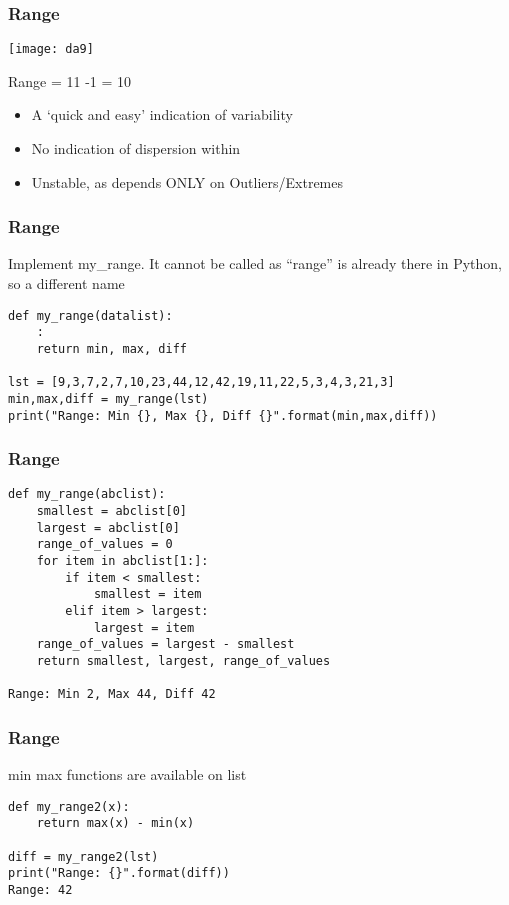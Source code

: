 \begin{frame}[fragile]\frametitle{Range}	
\begin{center}
\texttt{[image: da9]}
\end{center}
Range = 11 -1 = 10

\begin{itemize}
\item A `quick and easy' indication of variability
\item No indication of dispersion within
\item Unstable, as depends ONLY on Outliers/Extremes
\end{itemize}
\end{frame}

\begin{frame}[fragile]\frametitle{Range}
Implement my\_range. It cannot be called as ``range'' is already there in Python, so a different name
\begin{lstlisting}
def my_range(datalist):
	:
	return min, max, diff

lst = [9,3,7,2,7,10,23,44,12,42,19,11,22,5,3,4,3,21,3]
min,max,diff = my_range(lst)
print("Range: Min {}, Max {}, Diff {}".format(min,max,diff))
\end{lstlisting}
\end{frame}

\begin{frame}[fragile]\frametitle{Range}
\begin{lstlisting}
def my_range(abclist):
    smallest = abclist[0]
    largest = abclist[0]
    range_of_values = 0
    for item in abclist[1:]:
        if item < smallest:
            smallest = item
        elif item > largest:
            largest = item
    range_of_values = largest - smallest
    return smallest, largest, range_of_values

Range: Min 2, Max 44, Diff 42
\end{lstlisting}
\end{frame}

\begin{frame}[fragile]\frametitle{Range}
min max functions are available on list
\begin{lstlisting}
def my_range2(x):
	return max(x) - min(x)

diff = my_range2(lst)
print("Range: {}".format(diff))	
Range: 42
\end{lstlisting}

\end{frame}



